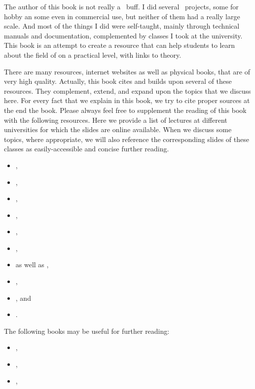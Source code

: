%
\begin{noglslink}%
%
The author of this book is not really a \db\ buff.
I did several \db\ projects, some for hobby an some even in commercial use, but neither of them had a really large scale.
And most of the things I did were self-taught, mainly through technical manuals and documentation, complemented by classes I took at the university.
This book is an attempt to create a resource that can help students to learn about the field of  on a practical level, with links to theory.

There are many resources, internet websites as well as physical books, that are of very high quality.
Actually, this book cites and builds upon several of these resources.
They complement, extend, and expand upon the topics that we discuss here.
For every fact that we explain in this book, we try to cite proper sources at the end the book.
Please always feel free to supplement the reading of this book with the following resources.%
%
%
Here we provide a list of lectures at different universities for which the slides are online available.
When we discuss some topics, where appropriate, we will also reference the corresponding slides of these classes as easily-accessible and concise further reading.%
\begin{itemize}%
\item {},%
\item {},%
\item {},%
\item {},%
\item {},%
\item {},%
\item {} as well as ,%
\item {},%
\item {}, and%
\item {}.%
\end{itemize}%
\endhsection%
%
%
The following books may be useful for further reading:%
\begin{itemize}%
\item {},%
\item {},%
\item {},%

\end{itemize}
\end{noglslink}
